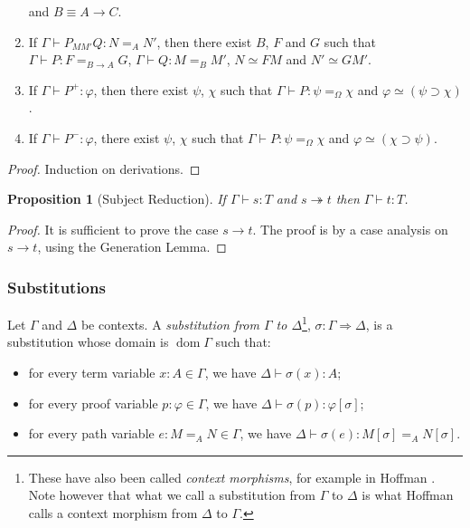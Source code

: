 \documentclass[a4paper,UKenglish]{lipics-v2016}
\newcommand*{\dom}{\ensuremath{\operatorname{dom}}}
\theoremstyle{plain}
\newtheorem{proposition}[theorem]{Proposition}
\theoremstyle{definition}
\begin{document}
\begin{lemma}[Generation]
\begin{enumerate}
and $B \equiv A \rightarrow C$.
\item
If $\Gamma \vdash P_{M M'} Q : N =_A N'$, then there exist $B$, $F$ and $G$ such that $\Gamma \vdash P : F =_{B \rightarrow A} G$, $\Gamma \vdash Q : M =_B M'$, $N \simeq F M$
and $N' \simeq G M'$.
\item
If $\Gamma \vdash P^+ : \varphi$, then there exist $\psi$, $\chi$ such that $\Gamma \vdash P : \psi =_\Omega \chi$ and $\varphi \simeq (\psi \supset \chi)$.
\item
If $\Gamma \vdash P^- : \varphi$, there exist $\psi$, $\chi$ such that $\Gamma \vdash P : \psi =_\Omega \chi$ and $\varphi \simeq (\chi \supset \psi)$.
\end{enumerate}
\end{lemma}

\begin{proof}
Induction on derivations.
\end{proof}

\begin{proposition}[Subject Reduction]
If $\Gamma \vdash s : T$ and $s \twoheadrightarrow t$ then $\Gamma \vdash t : T$.
\end{proposition}

\begin{proof}
It is sufficient to prove the case $s \rightarrow t$.  The proof is by a case analysis on $s \rightarrow t$, using the Generation Lemma.
\end{proof}

\subsubsection{Substitutions}

\begin{definition}
Let $\Gamma$ and $\Delta$ be contexts.  A \emph{substitution from $\Gamma$ to $\Delta$}\footnote{These have also been called \emph{context morphisms}, for example in Hoffman \cite{Hofmann97syntaxand}.  Note however that what we call a substitution from $\Gamma$ to $\Delta$ is what Hoffman calls a context morphism from $\Delta$ to $\Gamma$.}, $\sigma : \Gamma \Rightarrow \Delta$,
is a substitution whose domain is $\dom \Gamma$ such that:
\begin{itemize}
\item
for every term variable $x : A \in \Gamma$, we have $\Delta \vdash \sigma(x) : A$;
\item
for every proof variable $p : \varphi \in \Gamma$, we have $\Delta \vdash \sigma(p) : \varphi [ \sigma ]$;
\item
for every path variable $e : M =_A N \in \Gamma$, we have $\Delta \vdash \sigma(e) : M [ \sigma ] =_A N [ \sigma ]$.
\end{itemize}
\end{definition}
\end{document}
